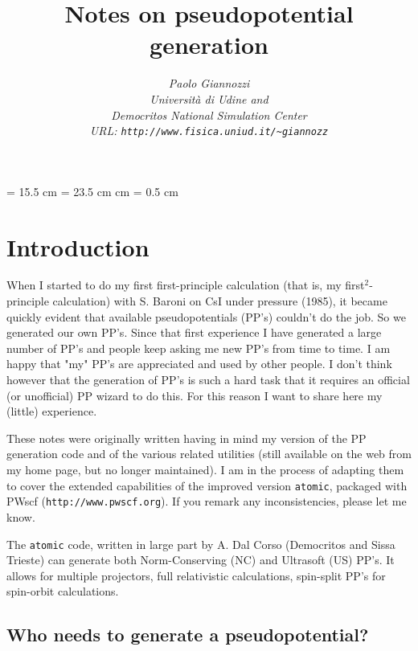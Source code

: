 \pagestyle{empty}
\textwidth = 15.5 cm
\textheight = 23.5 cm
 cm
\oddsidemargin = 0.5 cm
\listparindent=0pt
\itemsep=5pt
\def\r{{\bf r}}
 
\title{Notes on pseudopotential generation}
\author{\em Paolo Giannozzi\\
Universit\`a di Udine and \\
Democritos National Simulation Center\\
URL: {\tt http://www.fisica.uniud.it/\~{}giannozz}}
\maketitle

\section{Introduction} 

When I started to do my first first-principle calculation
(that is, my first$^2$-principle calculation) with S. Baroni
on CsI under pressure (1985), it became quickly evident that
available pseudopotentials (PP's) couldn't do the job. So we 
generated our own PP's. Since that first experience I have 
generated a large number of PP's and people keep asking me 
new PP's from time to time. I am happy that "my" PP's are 
appreciated and used by other people. I don't think however 
that the generation of PP's is such a hard task that it requires 
an official (or unofficial) PP wizard to do this. For this reason 
I want to share here my (little) experience.

These notes were originally written having in mind my version
of the PP generation code and of the various related utilities
(still available on the web from my home page, but no longer 
maintained). I am in the process of adapting them to cover the
extended capabilities of the improved version {\tt atomic}, 
packaged with PWscf ({\tt http://www.pwscf.org}). If you remark 
any inconsistencies, please let me know.

The {\tt atomic} code, written in large part by A. Dal Corso
(Democritos and Sissa Trieste) can generate both 
Norm-Conserving (NC) \cite{NC} and Ultrasoft (US) \cite{van} PP's.
It allows for multiple projectors, full relativistic calculations,
spin-split PP's for spin-orbit calculations.

\subsection{Who needs to generate a pseudopotential?}

